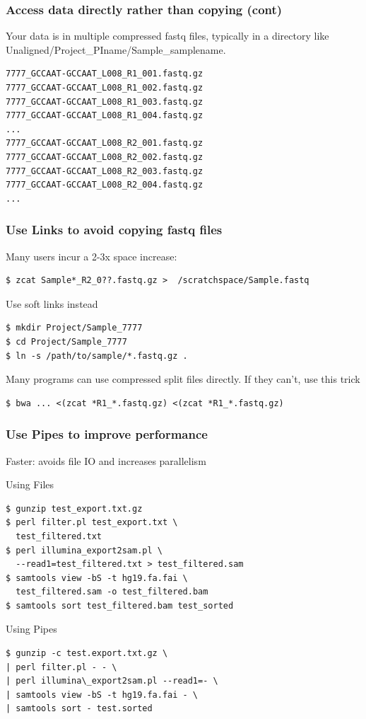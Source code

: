 \documentclass[10pt]{beamer}
\begin{document}
\begin{frame}[fragile]
\frametitle{Access data directly rather than copying (cont)}

Your data is in multiple compressed fastq files, typically in a directory
like Unaligned/Project\_PIname/Sample\_samplename.  

\begin{verbatim}
7777_GCCAAT-GCCAAT_L008_R1_001.fastq.gz
7777_GCCAAT-GCCAAT_L008_R1_002.fastq.gz
7777_GCCAAT-GCCAAT_L008_R1_003.fastq.gz
7777_GCCAAT-GCCAAT_L008_R1_004.fastq.gz
...
7777_GCCAAT-GCCAAT_L008_R2_001.fastq.gz
7777_GCCAAT-GCCAAT_L008_R2_002.fastq.gz
7777_GCCAAT-GCCAAT_L008_R2_003.fastq.gz
7777_GCCAAT-GCCAAT_L008_R2_004.fastq.gz
...
\end{verbatim}
\end{frame}


\begin{frame}[fragile]
\frametitle{Use Links to avoid copying fastq files}
Many users incur a 2-3x space increase:

\begin{verbatim}
$ zcat Sample*_R2_0??.fastq.gz >  /scratchspace/Sample.fastq
\end{verbatim}

Use soft links instead
\begin{verbatim}
$ mkdir Project/Sample_7777
$ cd Project/Sample_7777
$ ln -s /path/to/sample/*.fastq.gz .
\end{verbatim}

Many programs can use compressed split files directly.  If they can't, use this trick
\begin{verbatim}
$ bwa ... <(zcat *R1_*.fastq.gz) <(zcat *R1_*.fastq.gz) 
\end{verbatim}
\end{frame}

\begin{frame}[fragile]
\frametitle{Use Pipes to improve performance}

\vskip10pt
Faster: avoids file IO and increases parallelism

\vskip10pt
Using Files
\begin{verbatim}
$ gunzip test_export.txt.gz 
$ perl filter.pl test_export.txt \
  test_filtered.txt
$ perl illumina_export2sam.pl \
  --read1=test_filtered.txt > test_filtered.sam
$ samtools view -bS -t hg19.fa.fai \
  test_filtered.sam -o test_filtered.bam
$ samtools sort test_filtered.bam test_sorted
\end{verbatim}

Using Pipes
\begin{verbatim}
$ gunzip -c test.export.txt.gz \
| perl filter.pl - - \
| perl illumina\_export2sam.pl --read1=- \
| samtools view -bS -t hg19.fa.fai - \
| samtools sort - test.sorted
\end{verbatim}
\end{frame}
\end{document}
